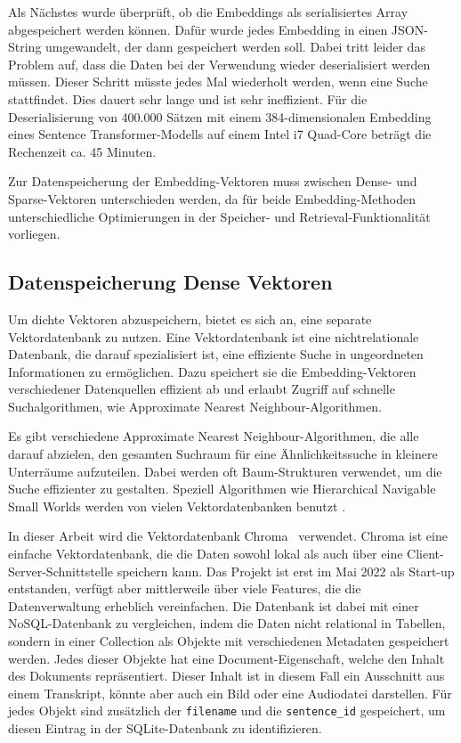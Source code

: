 Als Nächstes wurde überprüft, ob die Embeddings als serialisiertes Array abgespeichert werden können.
Dafür wurde jedes Embedding in einen JSON-String umgewandelt, der dann gespeichert werden soll.
Dabei tritt leider das Problem auf, dass die Daten bei der Verwendung wieder deserialisiert werden müssen.
Dieser Schritt müsste jedes Mal wiederholt werden, wenn eine Suche stattfindet.
Dies dauert sehr lange und ist sehr ineffizient.
Für die Deserialisierung von 400.000 Sätzen mit einem 384-dimensionalen Embedding eines Sentence Transformer-Modells auf einem Intel i7 Quad-Core beträgt die Rechenzeit ca. 45 Minuten.

Zur Datenspeicherung der Embedding-Vektoren muss zwischen Dense- und Sparse-Vektoren unterschieden werden, da für beide Embedding-Methoden unterschiedliche Optimierungen in der Speicher- und Retrieval-Funktionalität vorliegen.

\subsection{Datenspeicherung Dense Vektoren}

Um dichte Vektoren abzuspeichern, bietet es sich an, eine separate Vektordatenbank zu nutzen.
Eine Vektordatenbank ist eine nichtrelationale Datenbank, die darauf spezialisiert ist, eine effiziente Suche in ungeordneten Informationen zu ermöglichen.
Dazu speichert sie die Embedding-Vektoren verschiedener Datenquellen effizient ab und erlaubt Zugriff auf schnelle Suchalgorithmen, wie Approximate Nearest Neighbour-Algorithmen.

Es gibt verschiedene Approximate Nearest Neighbour-Algorithmen, die alle darauf abzielen, den gesamten Suchraum für eine Ähnlichkeitssuche in kleinere Unterräume aufzuteilen.
Dabei werden oft Baum-Strukturen verwendet, um die Suche effizienter zu gestalten.
Speziell Algorithmen wie Hierarchical Navigable Small Worlds werden von vielen Vektordatenbanken benutzt \cite{malkov2020}.

In dieser Arbeit wird die Vektordatenbank Chroma~\cite{zotero-559} verwendet.
Chroma ist eine einfache Vektordatenbank, die die Daten sowohl lokal als auch über eine Client-Server-Schnittstelle speichern kann.
Das Projekt ist erst im Mai 2022 als Start-up entstanden, verfügt aber mittlerweile über viele Features, die die Datenverwaltung erheblich vereinfachen.
Die Datenbank ist dabei mit einer NoSQL-Datenbank zu vergleichen, indem die Daten nicht relational in Tabellen, sondern in einer Collection als Objekte mit verschiedenen Metadaten gespeichert werden.
Jedes dieser Objekte hat eine Document-Eigenschaft, welche den Inhalt des Dokuments repräsentiert.
Dieser Inhalt ist in diesem Fall ein Ausschnitt aus einem Transkript, könnte aber auch ein Bild oder eine Audiodatei darstellen.
Für jedes Objekt sind zusätzlich der \texttt{filename} und die \texttt{sentence\_id} gespeichert, um diesen Eintrag in der SQLite-Datenbank zu identifizieren.


